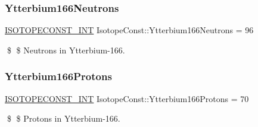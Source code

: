 \subsubsection{\texorpdfstring{Ytterbium166\+Neutrons}{Ytterbium166Neutrons}}
{\footnotesize\ttfamily \mbox{\hyperlink{group___isotope_const-_macros_ga5f18360b3e99483a35c32d789e62621c}{I\+S\+O\+T\+O\+P\+E\+C\+O\+N\+S\+T\+\_\+\+I\+NT}} Isotope\+Const\+::\+Ytterbium166\+Neutrons = 96}

\$ \$ Neutrons in Ytterbium-\/166. \mbox{\label{group___isotope_const-_ytterbium-_yb166_gaefc5dea41be5e408e5cd5e2c31dba765}} 
\subsubsection{\texorpdfstring{Ytterbium166\+Protons}{Ytterbium166Protons}}
{\footnotesize\ttfamily \mbox{\hyperlink{group___isotope_const-_macros_ga5f18360b3e99483a35c32d789e62621c}{I\+S\+O\+T\+O\+P\+E\+C\+O\+N\+S\+T\+\_\+\+I\+NT}} Isotope\+Const\+::\+Ytterbium166\+Protons = 70}

\$ \$ Protons in Ytterbium-\/166. 